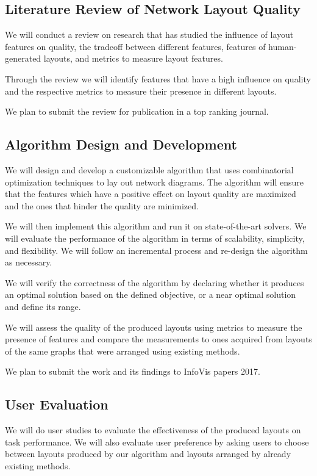 \documentclass[a4paper,11pt,phdthesis,singlespace,twoside]{cssethesis}
\begin{document}
\subsection{Literature Review of Network Layout Quality}
We will conduct a review on research that has studied the influence of layout features on quality, the tradeoff between different features, features of human-generated layouts, and metrics to measure layout features. 

Through the review we will identify features that have a high influence on quality and the respective metrics to measure their presence in different layouts.

We plan to submit the review for publication in a top ranking journal.

\subsection{Algorithm Design and Development}

We will design and develop a customizable algorithm that uses combinatorial optimization techniques to lay out network diagrams. The algorithm will ensure that the features which have a positive effect on layout quality are maximized and the ones that hinder the quality are minimized.

We will then implement this algorithm and run it on state-of-the-art solvers. We will evaluate the performance of the algorithm in terms of scalability, simplicity, and flexibility. We will follow an incremental process and re-design the algorithm as necessary.

We will verify the correctness of the algorithm by declaring whether it produces an optimal solution based on the defined objective, or a near optimal solution and define its range.

We will assess the quality of the produced layouts using metrics to measure the presence of features and compare the measurements to ones acquired from layouts of the same graphs that were arranged using existing methods.

We plan to submit the work and its findings to InfoVis papers 2017.

\subsection{User Evaluation}
We will do user studies to evaluate the effectiveness of the produced layouts on task performance. We will also evaluate user preference by asking users to choose between layouts produced by our algorithm and layouts arranged by already existing methods.
\end{document}
